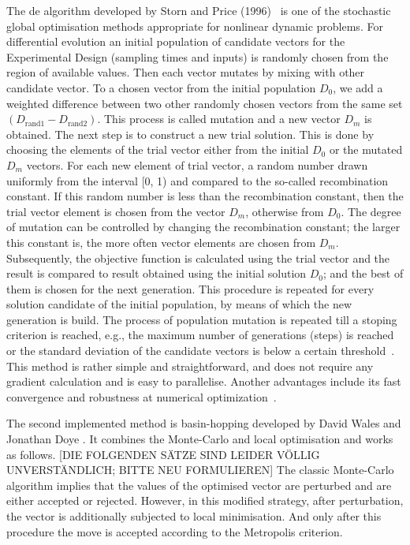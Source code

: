 \documentclass[10pt,A4paper]{article}
\begin{document}
The \ac{de} algorithm developed by Storn and Price (1996)~\cite{stornDifferentialEvolutionSimple1997} is one of the stochastic global optimisation methods appropriate for nonlinear dynamic problems.
For differential evolution an initial population of candidate vectors for the Experimental Design (sampling times and inputs) is randomly chosen from the region of available values.
Then each vector mutates by mixing with other candidate vector.
To a chosen vector from the initial population $D_0$, we add a weighted difference between two other randomly chosen vectors from the same set $(D_\text{rand1} - D_\text{rand2})$.
This process is called mutation and a new vector $D_m$ is obtained. The next step is to construct a new trial solution.
This is done by choosing the elements of the trial vector either from the initial $D_0$ or the mutated $D_m$ vectors. 
For each new element of trial vector, a random number drawn uniformly from the interval [0, 1) and compared to the so-called recombination constant.
If this random number is less than the recombination constant, then the trial vector element is chosen from the vector $D_m$, otherwise from $D_0$.
The degree of mutation can be controlled by changing the recombination constant; the larger this constant is, the more often vector elements are chosen from $D_m$.
Subsequently, the objective function is calculated using the trial vector and the result is compared to result obtained using the initial solution $D_0$; and the best of them is chosen for the next generation.
This procedure is repeated for every solution candidate of the initial population, by means of which the new generation is build.
The process of population mutation is repeated till a stoping criterion is reached, e.g., the maximum number of generations (steps) is reached or the standard deviation of the candidate vectors is below a certain threshold~\cite{Zielinski_DE}.
This method is rather simple and straightforward, and does not require any gradient calculation and is easy to parallelise.
Another advantages include its fast convergence and robustness at numerical optimization~\cite{babu_differential_2007}.
\newline

The second implemented method is basin-hopping developed by David Wales and Jonathan Doye \cite{walesGlobalOptimizationBasinHopping1997}.
It combines the Monte-Carlo and local optimisation and works as follows. [DIE FOLGENDEN SÄTZE SIND LEIDER VÖLLIG UNVERSTÄNDLICH; BITTE NEU FORMULIEREN]
The classic Monte-Carlo algorithm implies that the values of the optimised vector are perturbed and are either accepted or rejected.
However, in this modified strategy, after perturbation, the vector is additionally subjected to local minimisation. And only after this procedure the move is accepted according to the Metropolis criterion.
\newline
\end{document}
